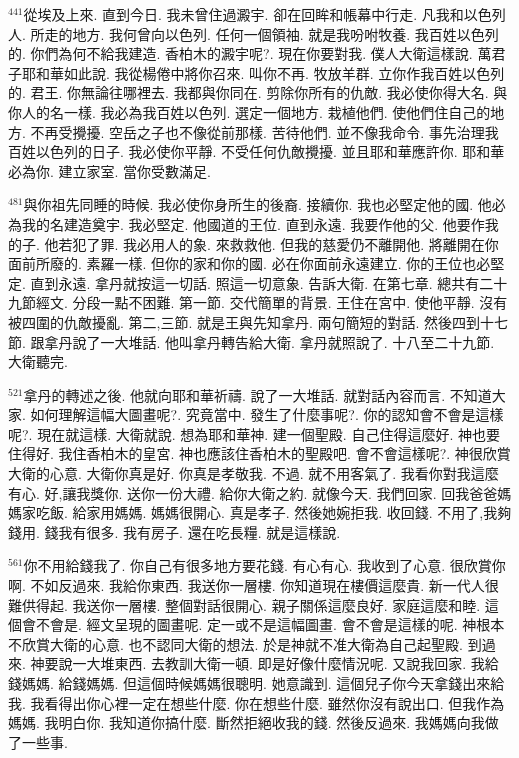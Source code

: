 \documentclass{book}
\begin{document}
$^{441}$從埃及上來.
直到今日.
我未曾住過澱宇.
卻在回眸和帳幕中行走.
凡我和以色列人.
所走的地方.
我何曾向以色列.
任何一個領袖.
就是我吩咐牧養.
我百姓以色列的.
你們為何不給我建造.
香柏木的澱宇呢?.
現在你要對我.
僕人大衛這樣說.
萬君子耶和華如此說.
我從楊倦中將你召來.
叫你不再.
牧放羊群.
立你作我百姓以色列的.
君王.
你無論往哪裡去.
我都與你同在.
剪除你所有的仇敵.
我必使你得大名.
與你人的名一樣.
我必為我百姓以色列.
選定一個地方.
栽植他們.
使他們住自己的地方.
不再受攪擾.
空岳之子也不像從前那樣.
苦待他們.
並不像我命令.
事先治理我百姓以色列的日子.
我必使你平靜.
不受任何仇敵攪擾.
並且耶和華應許你.
耶和華必為你.
建立家室.
當你受數滿足.

$^{481}$與你祖先同睡的時候.
我必使你身所生的後裔.
接續你.
我也必堅定他的國.
他必為我的名建造奠宇.
我必堅定.
他國道的王位.
直到永遠.
我要作他的父.
他要作我的子.
他若犯了罪.
我必用人的象.
來救救他.
但我的慈愛仍不離開他.
將離開在你面前所廢的.
素羅一樣.
但你的家和你的國.
必在你面前永遠建立.
你的王位也必堅定.
直到永遠.
拿丹就按這一切話.
照這一切意象.
告訴大衛.
在第七章.
總共有二十九節經文.
分段一點不困難.
第一節.
交代簡單的背景.
王住在宮中.
使他平靜.
沒有被四圍的仇敵擾亂.
第二,三節.
就是王與先知拿丹.
兩句簡短的對話.
然後四到十七節.
跟拿丹說了一大堆話.
他叫拿丹轉告給大衛.
拿丹就照說了.
十八至二十九節.
大衛聽完.

$^{521}$拿丹的轉述之後.
他就向耶和華祈禱.
說了一大堆話.
就對話內容而言.
不知道大家.
如何理解這幅大圖畫呢?.
究竟當中.
發生了什麼事呢?.
你的認知會不會是這樣呢?.
現在就這樣.
大衛就說.
想為耶和華神.
建一個聖殿.
自己住得這麼好.
神也要住得好.
我住香柏木的皇宮.
神也應該住香柏木的聖殿吧.
會不會這樣呢?.
神很欣賞大衛的心意.
大衛你真是好.
你真是孝敬我.
不過.
就不用客氣了.
我看你對我這麼有心.
好,讓我獎你.
送你一份大禮.
給你大衛之約.
就像今天.
我們回家.
回我爸爸媽媽家吃飯.
給家用媽媽.
媽媽很開心.
真是孝子.
然後她婉拒我.
收回錢.
不用了,我夠錢用.
錢我有很多.
我有房子.
還在吃長糧.
就是這樣說.

$^{561}$你不用給錢我了.
你自己有很多地方要花錢.
有心有心.
我收到了心意.
很欣賞你啊.
不如反過來.
我給你東西.
我送你一層樓.
你知道現在樓價這麼貴.
新一代人很難供得起.
我送你一層樓.
整個對話很開心.
親子關係這麼良好.
家庭這麼和睦.
這個會不會是.
經文呈現的圖畫呢.
定一或不是這幅圖畫.
會不會是這樣的呢.
神根本不欣賞大衛的心意.
也不認同大衛的想法.
於是神就不准大衛為自己起聖殿.
到過來.
神要說一大堆東西.
去教訓大衛一頓.
即是好像什麼情況呢.
又說我回家.
我給錢媽媽.
給錢媽媽.
但這個時候媽媽很聰明.
她意識到.
這個兒子你今天拿錢出來給我.
我看得出你心裡一定在想些什麼.
你在想些什麼.
雖然你沒有說出口.
但我作為媽媽.
我明白你.
我知道你搞什麼.
斷然拒絕收我的錢.
然後反過來.
我媽媽向我做了一些事.
\end{document}
